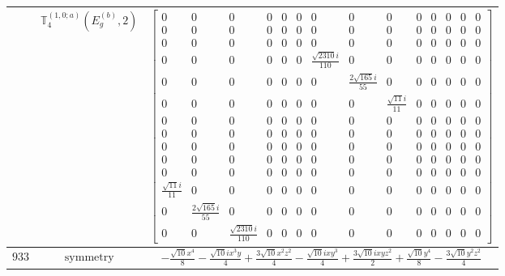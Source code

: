 \documentclass[fleqn,8pt,landscape]{jsarticle}
\begin{document}
\begin{longtable}{ccc}
$  $ & $ \mathbb{T}_{4}^{(1,0;a)}(E_{g}^{(b)},2) $ & $ \begin{bmatrix} 0 & 0 & 0 & 0 & 0 & 0 & 0 & 0 & 0 & 0 & 0 & 0 & 0 & 0 \\ 0 & 0 & 0 & 0 & 0 & 0 & 0 & 0 & 0 & 0 & 0 & 0 & 0 & 0 \\ 0 & 0 & 0 & 0 & 0 & 0 & 0 & 0 & 0 & 0 & 0 & 0 & 0 & 0 \\ 0 & 0 & 0 & 0 & 0 & 0 & \frac{\sqrt{2310} i}{110} & 0 & 0 & 0 & 0 & 0 & 0 & 0 \\ 0 & 0 & 0 & 0 & 0 & 0 & 0 & \frac{2 \sqrt{165} i}{55} & 0 & 0 & 0 & 0 & 0 & 0 \\ 0 & 0 & 0 & 0 & 0 & 0 & 0 & 0 & \frac{\sqrt{11} i}{11} & 0 & 0 & 0 & 0 & 0 \\ 0 & 0 & 0 & 0 & 0 & 0 & 0 & 0 & 0 & 0 & 0 & 0 & 0 & 0 \\ 0 & 0 & 0 & 0 & 0 & 0 & 0 & 0 & 0 & 0 & 0 & 0 & 0 & 0 \\ 0 & 0 & 0 & 0 & 0 & 0 & 0 & 0 & 0 & 0 & 0 & 0 & 0 & 0 \\ 0 & 0 & 0 & 0 & 0 & 0 & 0 & 0 & 0 & 0 & 0 & 0 & 0 & 0 \\ 0 & 0 & 0 & 0 & 0 & 0 & 0 & 0 & 0 & 0 & 0 & 0 & 0 & 0 \\ \frac{\sqrt{11} i}{11} & 0 & 0 & 0 & 0 & 0 & 0 & 0 & 0 & 0 & 0 & 0 & 0 & 0 \\ 0 & \frac{2 \sqrt{165} i}{55} & 0 & 0 & 0 & 0 & 0 & 0 & 0 & 0 & 0 & 0 & 0 & 0 \\ 0 & 0 & \frac{\sqrt{2310} i}{110} & 0 & 0 & 0 & 0 & 0 & 0 & 0 & 0 & 0 & 0 & 0 \end{bmatrix} $ \\ \hline
$ 933 $ & $ \text{symmetry} $ & $ - \frac{\sqrt{10} x^{4}}{8} - \frac{\sqrt{10} i x^{3} y}{4} + \frac{3 \sqrt{10} x^{2} z^{2}}{4} - \frac{\sqrt{10} i x y^{3}}{4} + \frac{3 \sqrt{10} i x y z^{2}}{2} + \frac{\sqrt{10} y^{4}}{8} - \frac{3 \sqrt{10} y^{2} z^{2}}{4} $ \\

\end{longtable}
\end{document}
